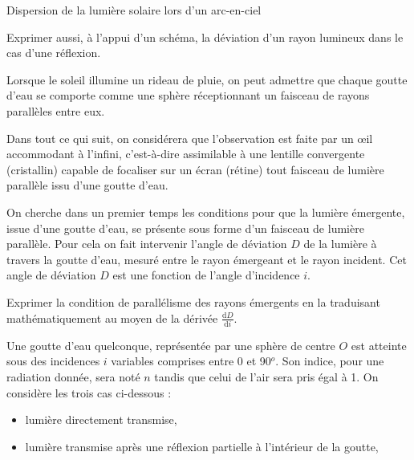 \begin{exo}[PCSI]{Dispersion de la lumière solaire lors d'un arc-en-ciel}
\begin{quest}
\begin{quest}

\item Exprimer aussi, à l'appui d'un schéma, la déviation d'un rayon lumineux dans le cas d'une réflexion.

\end{quest}
\item Lorsque le soleil illumine un rideau de pluie, on peut admettre que chaque goutte d'eau se comporte comme une sphère réceptionnant un faisceau de rayons parallèles entre eux.

Dans tout ce qui suit, on considérera que l'observation est faite par un {\oe}il accommodant à l'infini, c'est-à-dire assimilable à une lentille convergente (cristallin) capable de focaliser sur un écran (rétine) tout faisceau de lumière parallèle issu d'une goutte d'eau.

On cherche dans un premier temps les conditions pour que la lumière émergente, issue d'une goutte d'eau, se présente sous forme d'un faisceau de lumière parallèle. Pour cela on fait intervenir l'angle de déviation $D$ de la lumière à travers la goutte d'eau, mesuré entre le rayon émergeant et le rayon incident. Cet angle de déviation $D$ est une fonction de l'angle d'incidence $i$.

Exprimer la condition de parallélisme des rayons émergents en la traduisant mathématiquement au moyen de la dérivée $\frac{\mathrm{d}D}{\mathrm{d}i}$.


\bigskip

Une goutte d'eau quelconque, représentée par une sphère de centre $O$ est atteinte sous des incidences $i$ variables comprises entre 0 et 90$^o$. Son indice, pour une radiation donnée, sera noté $n$ tandis que celui de l'air sera pris égal à 1.
On considère les trois cas ci-dessous :
\begin{itemize}
\item lumière directement transmise,

\item lumière transmise après une réflexion partielle à l'intérieur de la goutte,


\end{itemize}
\end{quest}
\end{exo}
